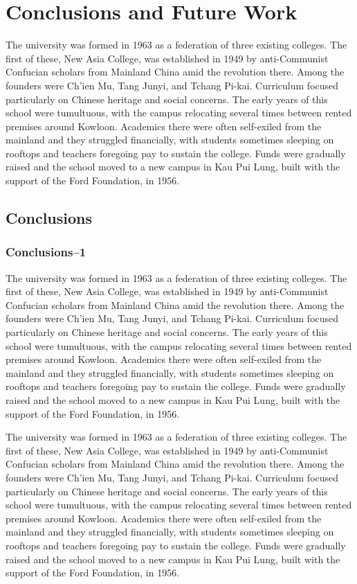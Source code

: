 %
\chapter{Conclusions and Future Work}
\label{sec:conclusion}

\noindent The university was formed in 1963 as a federation of three existing colleges. The first of these, New Asia College, was established in 1949 by anti-Communist Confucian scholars from Mainland China amid the revolution there. Among the founders were Ch'ien Mu, Tang Junyi, and Tchang Pi-kai. Curriculum focused particularly on Chinese heritage and social concerns. The early years of this school were tumultuous, with the campus relocating several times between rented premises around Kowloon. Academics there were often self-exiled from the mainland and they struggled financially, with students sometimes sleeping on rooftops and teachers foregoing pay to sustain the college. Funds were gradually raised and the school moved to a new campus in Kau Pui Lung, built with the support of the Ford Foundation, in 1956.

\section{Conclusions}
\subsection{Conclusions--1}
\noindent The university was formed in 1963 as a federation of three existing colleges. The first of these, New Asia College, was established in 1949 by anti-Communist Confucian scholars from Mainland China amid the revolution there. Among the founders were Ch'ien Mu, Tang Junyi, and Tchang Pi-kai. Curriculum focused particularly on Chinese heritage and social concerns. The early years of this school were tumultuous, with the campus relocating several times between rented premises around Kowloon. Academics there were often self-exiled from the mainland and they struggled financially, with students sometimes sleeping on rooftops and teachers foregoing pay to sustain the college. Funds were gradually raised and the school moved to a new campus in Kau Pui Lung, built with the support of the Ford Foundation, in 1956.


The university was formed in 1963 as a federation of three existing colleges. The first of these, New Asia College, was established in 1949 by anti-Communist Confucian scholars from Mainland China amid the revolution there. Among the founders were Ch'ien Mu, Tang Junyi, and Tchang Pi-kai. Curriculum focused particularly on Chinese heritage and social concerns. The early years of this school were tumultuous, with the campus relocating several times between rented premises around Kowloon. Academics there were often self-exiled from the mainland and they struggled financially, with students sometimes sleeping on rooftops and teachers foregoing pay to sustain the college. Funds were gradually raised and the school moved to a new campus in Kau Pui Lung, built with the support of the Ford Foundation, in 1956.

